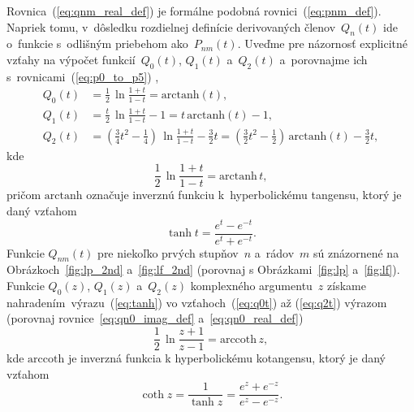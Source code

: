 \documentclass[a4paper,12pt]{book}
\begin{document}
Rovnica~(\ref{eq:qnm_real_def}) je formálne podobná rovnici~(\ref{eq:pnm_def}).  
Napriek tomu, v~dôsledku rozdielnej definície derivovaných členov~$Q_n(t)$ ide 
o~funkcie s~odlišným priebehom ako~$P_{nm}(t)$.  Uveďme pre názornosť 
explicitné vzťahy na výpočet funkcií~$Q_0\left( t \right)$, $Q_1\left( 
t \right)$ a~$Q_2\left( t \right)$ a~porovnajme ich 
s~rovnicami~(\ref{eq:p0_to_p5})
\parencite{MoritzPhysicalGeodesy},
%
\begin{align}
\label{eq:q0t}
Q_0(t) &= \frac{1}{2} \, \ln\frac{1 + t}{1 - t} = \mathrm{arctanh}(t){,}\\
%
\label{eq:q1t}
Q_1(t) &= \frac{t}{2} \, \ln\frac{1 + t}{1 - t} - 1 = t \, \mathrm{arctanh}(t)- 
 1{,}\\
%
\label{eq:q2t}
Q_2(t) &= \left( \frac{3}{4} t^2 - \frac{1}{4} \right) \, \ln\frac{1 + t}{1 
- t} - \frac{3}{2}t = \left( \frac{3}{2} t^2 - \frac{1}{2} \right) \, 
\mathrm{arctanh}(t) - \frac{3}{2}t{,}
\end{align}
%
kde
%
\begin{equation}
\label{eq:tanh}
\frac{1}{2} \, \ln \frac{1 + t}{1 - t} = \mathrm{arctanh} \, t{,}
\end{equation}
%
pričom $\mathrm{arctanh}$ označuje inverznú funkciu k~hyperbolickému tangensu, 
ktorý je daný vzťahom \parencite{Gradshteyn2007}
%
\begin{equation}
\tanh t = \frac{e^t - e^{-t}}{e^t + e^{-t}}{.}
\end{equation}
%
Funkcie $Q_{nm}(t)$ pre niekoľko prvých stupňov~$n$ a~rádov~$m$ sú znázornené 
na Obrázkoch~\ref{fig:lp_2nd} a~\ref{fig:lf_2nd} (porovnaj 
s Obrázkami~\ref{fig:lp} a~\ref{fig:lf}).  Funkcie $Q_0\left( z \right)$, 
$Q_1\left( z \right)$ a~$Q_2\left( z \right)$ komplexného argumentu~$z$ získame 
nahradením~výrazu~(\ref{eq:tanh}) vo vzťahoch~(\ref{eq:q0t}) až (\ref{eq:q2t}) 
výrazom (porovnaj rovnice~\ref{eq:qn0_imag_def} a~\ref{eq:qn0_real_def})
%
\begin{equation}
\label{eq:arccoth}
\frac{1}{2} \, \ln \frac{z + 1}{z - 1} = \mathrm{arccoth} \, z{,}
\end{equation}
%
kde $\mathrm{arccoth}$ je inverzná funkcia k hyperbolickému kotangensu, ktorý 
je daný vzťahom \parencite{Gradshteyn2007}
%
\begin{equation}
\coth z = \frac{1}{\tanh z} =  \frac{e^z + e^{-z}}{e^z - e^{-z}}{.}
\end{equation}
\end{document}
